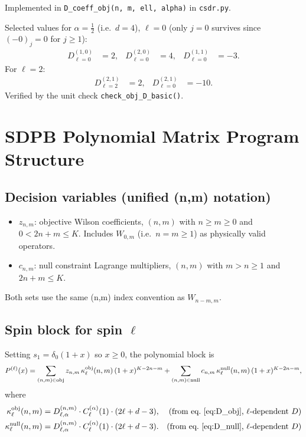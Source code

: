 \documentclass{article}
\begin{document}
Implemented in \texttt{D\_coeff\_obj(n, m, ell, alpha)} in \texttt{csdr.py}.

Selected values for $\alpha=\tfrac{1}{2}$ (i.e.\ $d=4$), $\ell=0$ (only $j=0$ survives since $(-0)_j=0$ for $j\ge1$):
\begin{align*}
  D^{(1,0)}_{\ell=0} &= 2, & D^{(2,0)}_{\ell=0} &= 4, & D^{(1,1)}_{\ell=0} &= -3.
\end{align*}
For $\ell=2$:
\begin{align*}
  D^{(2,1)}_{\ell=2} &= 2, & D^{(2,1)}_{\ell=0} &= -10.
\end{align*}
Verified by the unit check \texttt{check\_obj\_D\_basic()}.

\section{SDPB Polynomial Matrix Program Structure}

\subsection{Decision variables (unified (n,m) notation)}

\begin{itemize}
  \item $z_{n,m}$: objective Wilson coefficients, $(n,m)$ with $n\ge m\ge0$ and $0<2n+m\le K$.
        Includes $W_{0,m}$ (i.e.\ $n=m\ge1$) as physically valid operators.
  \item $c_{n,m}$: null constraint Lagrange multipliers, $(n,m)$ with $m>n\ge1$ and $2n+m\le K$.
\end{itemize}
Both sets use the same (n,m) index convention as $W_{n-m,m}$.

\subsection{Spin block for spin $\ell$}

Setting $s_1 = \delta_0(1+x)$ so $x\ge0$, the polynomial block is
\begin{equation}\label{eq:block}
  P^{(\ell)}(x)
  = \sum_{(n,m)\in\text{obj}} z_{n,m}\,\kappa_\ell^{\rm obj}(n,m)\,(1+x)^{K-2n-m}
  + \sum_{(n,m)\in\text{null}} c_{n,m}\,\kappa_\ell^{\rm null}(n,m)\,(1+x)^{K-2n-m},
\end{equation}
where
\begin{align}
  \kappa_\ell^{\rm obj}(n,m) &= D_{\ell,\alpha}^{(n,m)}\cdot C_\ell^{(\alpha)}(1)\cdot(2\ell+d-3),
  & \text{(from eq.~\eqref{eq:D_obj}, }\ell\text{-dependent }D\text{)} \label{eq:kappa_obj}\\
  \kappa_\ell^{\rm null}(n,m) &= D_{\ell,\alpha}^{(n,m)}\cdot C_\ell^{(\alpha)}(1)\cdot(2\ell+d-3).
  & \text{(from eq.~\eqref{eq:D_null}, }\ell\text{-dependent }D\text{)} \label{eq:kappa_null}
\end{align}
\end{document}
